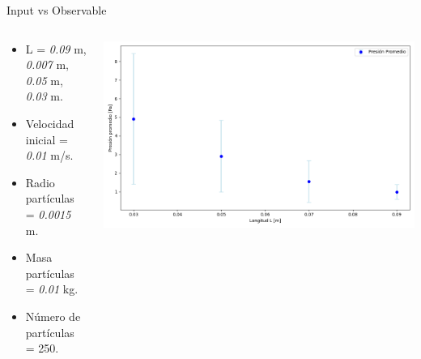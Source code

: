 \documentclass{beamer}
\begin{document}
\begin{frame}{Input vs Observable}
  \begin{columns}
    \begin{column}{0.40\textwidth}
      \scriptsize {}
      \begin{itemize}
        \item L = \textit{0.09} m, \textit{0.007} m, \textit{0.05} m, \textit{0.03} m. 
        \item Velocidad inicial = \textit{0.01} m/s.
        \item Radio partículas = \textit{0.0015} m.
        \item Masa partículas = \textit{0.01} kg.
        \item Número de partículas = 250.
      \end{itemize}
    \end{column}
    \begin{column}{0.60\textwidth}
      \includegraphics[width=1\linewidth]{photoMaterial/Presion_vs_L.png}
    \end{column}
  \end{columns}
\end{frame}
\end{document}
